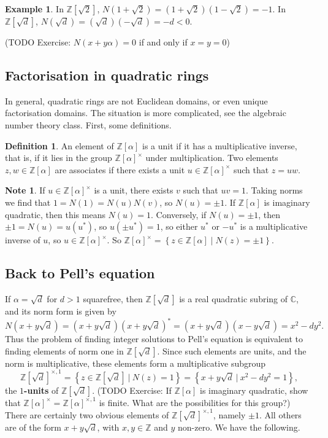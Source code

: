 \documentclass{article}
\newcommand{\Z}{\mathbb{Z}}
\newcommand{\C}{\mathbb{C}}
\newcommand{\rb}[1]{\left( #1 \right)}
\renewcommand{\sb}[1]{\left[ #1 \right]}
\newcommand{\cb}[1]{\left\{ #1 \right\}}
\theoremstyle{definition}\newtheorem{definition}{Definition}
\theoremstyle{definition}\newtheorem{remark}[definition]{Remark}
\theoremstyle{definition}\newtheorem*{example}{Example}
\theoremstyle{definition}\newtheorem*{note}{Note}
\begin{document}
\begin{example}
In $ \Z\sb{\sqrt{2}} $, $ N\rb{1 + \sqrt{2}} = \rb{1 + \sqrt{2}}\rb{1 - \sqrt{2}} = -1 $. In $ \Z\sb{\sqrt{d}} $, $ N\rb{\sqrt{d}} = \rb{\sqrt{d}}\rb{-\sqrt{d}} = -d < 0 $.
\end{example}

(TODO Exercise: $ N\rb{x + y\alpha} = 0 $ if and only if $ x = y = 0 $)

\subsection{Factorisation in quadratic rings}

In general, quadratic rings are not Euclidean domains, or even unique factorisation domains. The situation is more complicated, see the algebraic number theory class. First, some definitions.

\begin{definition}
An element of $ \Z\sb{\alpha} $ is a unit if it has a multiplicative inverse, that is, if it lies in the group $ \Z\sb{\alpha}^\times $ under multiplication. Two elements $ z, w \in \Z\sb{\alpha} $ are associates if there exists a unit $ u \in \Z\sb{\alpha}^\times $ such that $ z = uw $.
\end{definition}

\begin{note}
If $ u \in \Z\sb{\alpha}^\times $ is a unit, there exists $ v $ such that $ uv = 1 $. Taking norms we find that $ 1 = N\rb{1} = N\rb{u}N\rb{v} $, so $ N\rb{u} = \pm 1 $. If $ \Z\sb{\alpha} $ is imaginary quadratic, then this means $ N\rb{u} = 1 $. Conversely, if $ N\rb{u} = \pm 1 $, then $ \pm 1 = N\rb{u} = u\rb{u^*} $, so $ u\rb{\pm u^*} = 1 $, so either $ u^* $ or $ -u^* $ is a multiplicative inverse of $ u $, so $ u \in \Z\sb{\alpha}^\times $. So $ \Z\sb{\alpha}^\times = \cb{z \in \Z\sb{\alpha} \mid N\rb{z} = \pm 1} $.
\end{note}

\subsection{Back to Pell's equation}

If $ \alpha = \sqrt{d} $ for $ d > 1 $ squarefree, then $ \Z\sb{\sqrt{d}} $ is a real quadratic subring of $ \C $, and its norm form is given by
$$ N\rb{x + y\sqrt{d}} = \rb{x + y\sqrt{d}}\rb{x + y\sqrt{d}}^* = \rb{x + y\sqrt{d}}\rb{x - y\sqrt{d}} = x^2 - dy^2. $$
Thus the problem of finding integer solutions to Pell's equation is equivalent to finding elements of norm one in $ \Z\sb{\sqrt{d}} $. Since such elements are units, and the norm is multiplicative, these elements form a multiplicative subgroup
$$ \Z\sb{\sqrt{d}}^{\times, 1} = \cb{z \in \Z\sb{\sqrt{d}} \ \Big| \ N\rb{z} = 1} = \cb{x + y\sqrt{d} \ \Big| \ x^2 - dy^2 = 1}, $$
the \textbf{$ 1 $-units} of $ \Z\sb{\sqrt{d}} $. (TODO Exercise: If $ \Z\sb{\alpha} $ is imaginary quadratic, show that $ \Z\sb{\alpha}^\times = \Z\sb{\alpha}^{\times, 1} $ is finite. What are the possibilities for this group?) There are certainly two obvious elements of $ \Z\sb{\sqrt{d}}^{\times, 1} $, namely $ \pm 1 $. All others are of the form $ x + y\sqrt{d} $, with $ x, y \in \Z $ and $ y $ non-zero. We have the following.
\end{document}
